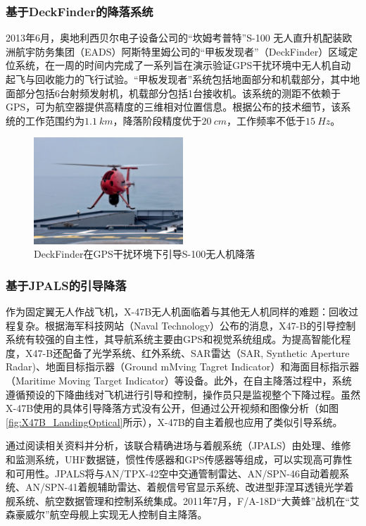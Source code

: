 \subsubsection{基于DeckFinder的降落系统}
2013年6月，奥地利西贝尔电子设备公司的“坎姆考普特”S-100 无人直升机配装欧洲航宇防务集团（EADS）阿斯特里姆公司的“甲板发现者”（DeckFinder）区域定位系统，在一周的时间内完成了一系列旨在演示验证GPS干扰环境中无人机自动起飞与回收能力的飞行试验。“甲板发现者”系统\cite{Deckfinder}包括地面部分和机载部分，其中地面部分包括6台射频发射机，机载部分包括1台接收机。该系统的测距不依赖于GPS，可为航空器提供高精度的三维相对位置信息。根据公布的技术细节，该系统的工作范围约为$1.1\ km$，降落阶段精度优于$20\ cm$，工作频率不低于$15\ Hz$。
\begin{figure}[!tb]   
	\centering	
	\includegraphics[width=0.5\textwidth]{Figs/28_Deckfinder.jpg}
	\caption{DeckFinder在GPS干扰环境下引导S-100无人机降落}
	\label{fig:28_Deckfinder}
\end{figure}

\subsubsection{基于JPALS的引导降落}
作为固定翼无人作战飞机，X-47B无人机面临着与其他无人机同样的难题：回收过程复杂。根据海军科技网站（Naval Technology）公布的消息\cite{X_47B_UCAS}，X47-B的引导控制系统有较强的自主性，其导航系统主要由GPS和视觉系统组成。为提高智能化程度，X47-B还配备了光学系统、红外系统、SAR雷达（SAR, Synthetic Aperture Radar)、地面目标指示器（Ground mMving Tagret Indicator）和海面目标指示器（Maritime Moving Target Indicator）等设备。此外，在自主降落过程中，系统遵循预设的下降曲线对飞机进行引导和控制，操作员只是监视整个下降过程。虽然X-47B使用的具体引导降落方式没有公开，但通过公开视频和图像分析（如图\ref{fig:X47B_LandingOptical}所示），X-47B的自主着舰也应用了类似引导系统。

通过阅读相关资料并分析，该联合精确进场与着舰系统（JPALS）由处理、维修和监测系统，UHF数据链，惯性传感器和GPS传感器等组成，可以实现高可靠性和可用性。JPALS将与AN/TPX-42空中交通管制雷达、AN/SPN-46自动着舰系统、AN/SPN-41着舰辅助雷达、着舰信号官显示系统、改进型菲涅耳透镜光学着舰系统、航空数据管理和控制系统集成。2011年7月，F/A-18D“大黄蜂”战机在“艾森豪威尔”航空母舰上实现无人控制自主降落。

